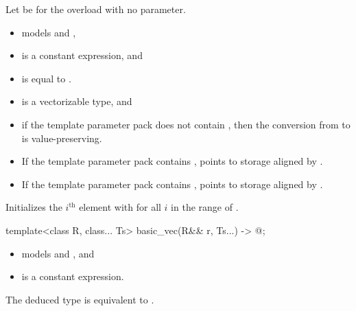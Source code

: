 \begin{itemdescr}
\pnum
Let  be  for the overload with no
 parameter.

\pnum
\constraints
\begin{itemize}
\item {} models  and
  ,
\item {} is a constant expression, and
\item {} is equal to .
\end{itemize}

\pnum
\mandates
\begin{itemize}
 \item
    is a vectorizable type, and
 \item
  if the template parameter pack  does not contain
  , then the conversion from
   to  is value-preserving.
\end{itemize}

\pnum
\expects
\begin{itemize}
 \item
   If the template parameter pack  contains
   ,  points to
   storage aligned by .
 \item
   If the template parameter pack  contains
   ,  points to
   storage aligned by .
\end{itemize}

\pnum
\effects
Initializes the $i^\text{th}$ element with  for all $i$ in the
range of .
\end{itemdescr}

\begin{itemdecl}
template<class R, class... Ts>
  basic_vec(R&& r, Ts...) -> @\seebelow@;
\end{itemdecl}

\begin{itemdescr}
\pnum
\constraints
\begin{itemize}
\item {} models  and
  , and
\item {} is a constant expression.
\end{itemize}

\pnum
\remarks
The deduced type is equivalent to .
\end{itemdescr}

